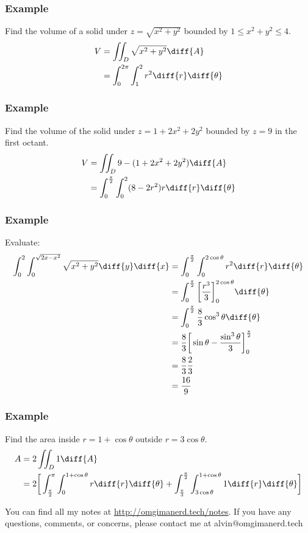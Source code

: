 \documentclass{math}
\begin{document}
\subsubsection*{Example}
Find the volume of a solid under \( z = \sqrt{x^2+y^2} \) bounded by
\( 1\le x^2+y^2\le 4 \).
\begin{align*}
  V &= \iint_{D}\sqrt{x^2+y^2}\diff{A} \\
  &= \int_{0}^{2\pi}\int_{1}^{2}r^2\diff{r}\diff{\theta} \\
\end{align*}

\subsubsection*{Example}
Find the volume of the solid under \( z = 1+2x^2+2y^2 \) bounded by
\( z = 9 \) in the first octant.
\begin{align*}
  V &= \iint_{D}9-(1+2x^2+2y^2)\diff{A} \\
  &= \int_{0}^{\frac{\pi}{2}}\int_{0}^{2}(8-2r^2)r\diff{r}\diff{\theta}
\end{align*}

\subsubsection*{Example}
Evaluate:
\begin{align*}
  \int_{0}^{2}\int_{0}^{\sqrt{2x-x^2}}\sqrt{x^2+y^2}\diff{y}\diff{x}
  &= \int_{0}^{\frac{\pi}{2}}\int_{0}^{2\cos\theta}r^2\diff{r}\diff{\theta} \\
  &= \int_{0}^{\frac{\pi}{2}}
    \bigg[\frac{r^3}{3}\bigg]_{0}^{2\cos\theta}\diff{\theta} \\
  &= \int_{0}^{\frac{\pi}{2}}\frac{8}{3}\cos^3\theta\diff{\theta} \\
  &= \frac{8}{3}
    \bigg[\sin\theta-\frac{\sin^3\theta}{3}\bigg]_{0}^{\frac{\pi}{2}} \\
  &= \frac{8}{3}\frac{2}{3} \\
  &= \frac{16}{9}
\end{align*}

\subsubsection*{Example}
Find the area inside \( r = 1+\cos\theta \) outside \( r = 3\cos\theta \).
\begin{align*}
  A &= 2\iint_{D}1\diff{A} \\
  &= 2\bigg[
    \int_{\frac{\pi}{2}}^{\pi}\int_{0}^{1+\cos\theta}r\diff{r}\diff{\theta}+
    \int_{\frac{\pi}{3}}^{\frac{\pi}{2}}
      \int_{3\cos\theta}^{1+\cos\theta}1\diff{r}\diff{\theta}
    \bigg]
\end{align*}

\begin{center}
  You can find all my notes at \url{http://omgimanerd.tech/notes}. If you have
  any questions, comments, or concerns, please contact me at
  alvin@omgimanerd.tech
\end{center}
\end{document}
